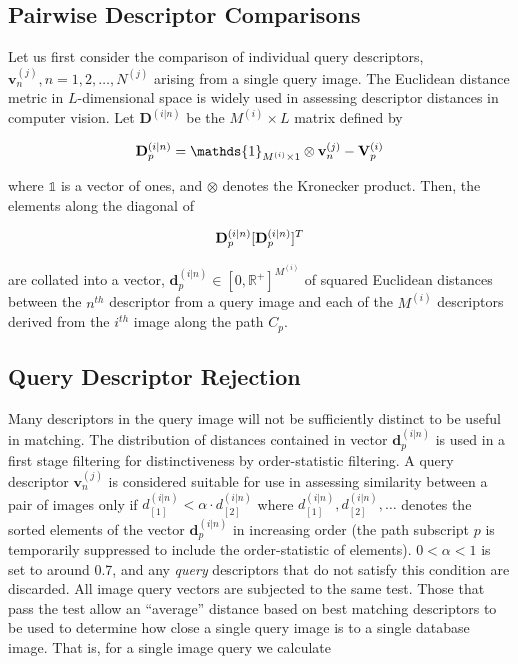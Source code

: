 \subsection{Pairwise Descriptor Comparisons} \label{subsec:pairwise}

Let us first consider the comparison of individual query descriptors, $\mathbf{v}_n^{(j)}, n=1,2,\ldots,N^{(j)}$ arising from a single query image.  The Euclidean distance metric in $L$-dimensional space is widely used in assessing descriptor distances in computer vision.  Let $\mathbf{D}^{(i|n)}$ be the $M^{(i)}\times L$ matrix defined by

\begin{equation}
\centering
\mathbf{D}^{(i|n)}_p =  \mathds{1}_{M^{(i)}\times 1} \otimes \mathbf{v}_n^{(j)} - \mathbf{V}^{(i)}_p
\end{equation}

where $\mathds{1}$ is a vector of ones, and $\otimes$ denotes the Kronecker product.
Then, the elements along the diagonal of

\begin{equation}
\centering
 \mathbf{D}^{(i|n)}_p[\mathbf{D}^{(i|n)}_p]^T
\end{equation}

are collated into a vector, $\mathbf{d}^{(i|n)}_p \in [0,\mathbb{R}^+]^{M^{(i)}}$ of squared Euclidean distances between the $n^{th}$ descriptor from a query image and each of the $M^{(i)}$ descriptors derived from the $i^{th}$ image along the path $C_p$. 

\subsection{Query Descriptor Rejection} \label{subsec:querydescrejection}
Many descriptors in the query image will not be sufficiently distinct to be useful in matching.  The distribution of distances contained in vector $\mathbf{d}^{(i|n)}_p$ is used in a first stage filtering for distinctiveness by order-statistic filtering.  A query descriptor $\mathbf{v}_n^{(j)}$ is considered suitable for use in assessing similarity between a pair of images only if $d^{(i|n)}_{[1]} < \alpha \cdot d^{(i|n)}_{[2]}$ where $d^{(i|n)}_{[1]}, d^{(i|n)}_{[2]},\ldots $ denotes the sorted elements of the vector $\mathbf{d}^{(i|n)}_p$ in increasing order (the path subscript $p$ is temporarily suppressed to include the order-statistic of elements).  $0<\alpha<1$ is set to around 0.7, and any \textit{query} descriptors that do not satisfy this condition are discarded. All image query vectors are subjected to the same test.  Those that pass the test allow an ``average'' distance based on best matching descriptors to be used to determine how close a single query image is to a single database image.  That is, for a single image query  we  calculate

